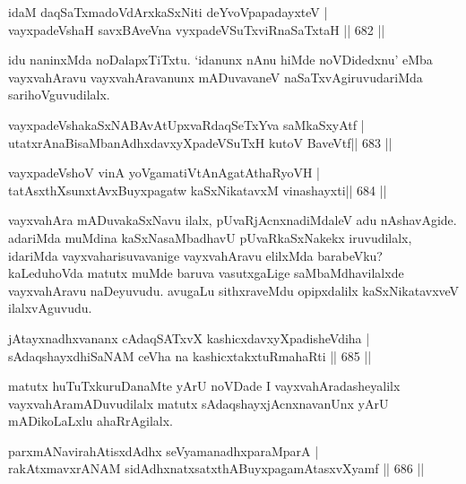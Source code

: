 \begin{shl}
idaM daqSaTxmadoV\s dArxkaSxNiti deYvoVpapadayxteV | \\
vayxpadeVshaH savxBAveVna vyxpadeVSuTxviRnaSaTxtaH \hfill||  682 ||  
\end{shl}

\begin{artha}
idu naninxMda noDalapxTiTxtu. `idanunx nAnu hiMde noVDidedxnu' eMba vayxvahAravu vayxvahAravanunx mADuvavaneV naSaTxvAgiruvudariMda sarihoVguvudilalx.
\end{artha}


\begin{shl}
vayxpadeVshakaSxNABAvAtUpxvaRdaqSeTxYva saMkaSxyAtf | \\
utatxrAnaBisaMbanAdhxdavxyXpadeVSuTxH kutoV BaveVtf\hfill ||  683 ||  
\end{shl}

\begin{shl}
vayxpadeVshoV vinA yoVgamatiVtAnAgatAthaRyoVH | \\
tatAsxthXsunxtAvxBuyxpagatw kaSxNikatavxM vinashayxti\hfill ||  684 ||  
\end{shl}

\begin{artha}
vayxvahAra mADuvakaSxNavu ilalx, pUvaRjAcnxnadiMdaleV adu nAshavAgide. adariMda muMdina kaSxNasaMbadhavU pUvaRkaSxNakekx iruvudilalx, idariMda vayxvaharisuvavanige vayxvahAravu elilxMda barabeVku? kaLeduhoVda matutx muMde baruva vasutxgaLige saMbaMdhavilalxde vayxvahAravu naDeyuvudu. avugaLu sithxraveMdu opipxdalilx kaSxNikatavxveV ilalxvAguvudu.
\end{artha}

\begin{shl}
\footnotemark[1]jAtayxnadhxvananx cAdaqSATxvX kashicxdavxyXpadisheVdiha | \\
sAdaqshayxdhiSaNAM ceVha na kashicxtakxtuRmahaRti \hfill||  685 ||  
\end{shl}

\begin{artha}
matutx huTuTxkuruDanaMte yArU noVDade I vayxvahAradasheyalilx vayxvahAramADuvudilalx matutx sAdaqshayxjAcnxnavanUnx yArU mADikoLaLxlu ahaRrAgilalx.
\end{artha}

\begin{shl}
parxmANavirahAtisxdAdhx seVyamanadhxparaMparA | \\
rakAtxmavxrANAM sidAdhxnatxsatxthA\s BuyxpagamAtasxvXyamf \hfill||  686 ||  
\end{shl}

